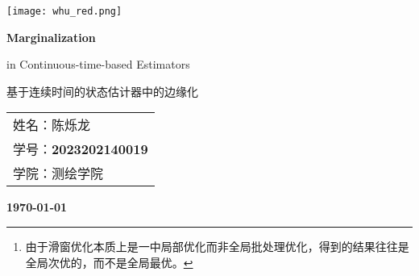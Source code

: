 \documentclass[12pt, onecolumn]{article}
\title{\normf{编程：观测值逐次更新的扩展卡尔曼滤波器}}
\author{\normf 姓名：陈烁龙\;\;\;学号：2023202140019\;\;\;学院：测绘学院}
\date{\normf{\today}}
\newcommand\normf{\fangsong}
\begin{document}
	\begin{titlepage}
	    \centering
	    \texttt{[image: whu\_red.png]}\par\vspace{1cm}
	    \vspace{4cm}
	    {\huge\kaishu\bfseries Marginalization\par in Continuous-time-based Estimators\par 基于连续时间的状态估计器中的边缘化 \par}
	    \vspace{3cm}
	    {\Large\kaishu 
	    \begin{center}\begin{tabular}{l}
	    姓名：陈烁龙\\
	    学号：\bfseries 2023202140019\\
	    学院：测绘学院
	    \end{tabular}\end{center}
	     \par}
	    
	
	    \vfill
	
	    {\large\kaishu\bfseries \today\par}
	\end{titlepage}
 		\thispagestyle{empty}
		\clearpage
		
		\tableofcontents
		\newpage
		\listoffigures
		
		\clearpage
		\setcounter{page}{1}
	
	
	\begin{abstract}
		\normf\bfseries
		近几年来，同时定位与地图构建(Simultaneous Localization And Mapping, SLAM)技术已经较为成熟，且被广泛应用于诸如自动驾驶、机器人领域中，来提供连续的位置服务和精确、一致的先验地图。出于实时性的要求，SLAM算法需要在优化精度和优化效率之间平衡。目前比较主流的方法是采用滑窗(Sliding Window)优化加边缘化(Marginalization)的策略，能够在保证实时性的同时，尽可能地减少局部优化\footnote{\normf 由于滑窗优化本质上是一中局部优化而非全局批处理优化，得到的结果往往是全局次优的，而不是全局最优。}带来的精度损失。
		
		目前绝大多的SLAM算法在进行优化的时候都针对的是离散位姿状态序列，是一种离散时间(Discrete Time，DT)估计方法。而相对应的连续时间(Continuous Time，CT)估计方法则使用时间域上的连续函数(比如B样条函数)表达位姿轨迹，优化的是连续函数的参量。相比于DT估计方法，CT估计方法在考虑了运动连续性的同时，能够更有利于异步、高频多源传感器的融合。CT方法目前在SLAM技术上应用的不是很多，主要是因为其优化量较大，效率较低。
		
		本文聚焦于基于CT的估计器中的边缘化问题，进行CT估计器中边缘化算法的探究、实现和测试。由于本人的研究方向是连续时间相关的SLAM技术，因此在本次考察报告中，在不偏离课程主题的情况下，对边缘化这一问题进行理论层面和实现层面的探究。
	\end{abstract}
	
\end{document}
